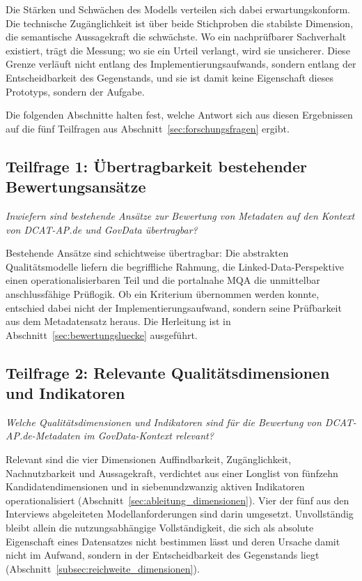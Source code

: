 Die Stärken und Schwächen des Modells verteilen sich dabei erwartungskonform. Die
technische Zugänglichkeit ist über beide Stichproben die stabilste Dimension, die
semantische Aussagekraft die schwächste. Wo ein nachprüfbarer Sachverhalt
existiert, trägt die Messung; wo sie ein Urteil verlangt, wird sie unsicherer.
Diese Grenze verläuft nicht entlang des Implementierungsaufwands, sondern entlang
der Entscheidbarkeit des Gegenstands, und sie ist damit keine Eigenschaft dieses
Prototyps, sondern der Aufgabe.

Die folgenden Abschnitte halten fest, welche Antwort sich aus diesen Ergebnissen
auf die fünf Teilfragen aus Abschnitt~\ref{sec:forschungsfragen} ergibt.

\subsection{Teilfrage 1: Übertragbarkeit bestehender Bewertungsansätze}
\label{sec:disk_grundlagen}

\emph{Inwiefern sind bestehende Ansätze zur Bewertung von Metadaten auf den
Kontext von DCAT-AP.de und GovData übertragbar?}

Bestehende Ansätze sind schichtweise übertragbar: Die abstrakten Qualitätsmodelle
liefern die begriffliche Rahmung, die Linked-Data-Perspektive einen
operationalisierbaren Teil und die portalnahe MQA die unmittelbar anschlussfähige
Prüflogik. Ob ein Kriterium übernommen werden konnte, entschied dabei nicht der
Implementierungsaufwand, sondern seine Prüfbarkeit aus dem Metadatensatz heraus.
Die Herleitung ist in Abschnitt~\ref{sec:bewertungsluecke} ausgeführt.

\subsection{Teilfrage 2: Relevante Qualitätsdimensionen und Indikatoren}
\label{sec:disk_dimensionen}

\emph{Welche Qualitätsdimensionen und Indikatoren sind für die Bewertung von
DCAT-AP.de-Metadaten im GovData-Kontext relevant?}

Relevant sind die vier Dimensionen Auffindbarkeit, Zugänglichkeit,
Nachnutzbarkeit und Aussagekraft, verdichtet aus einer Longlist von fünfzehn
Kandidatendimensionen und in siebenundzwanzig aktiven Indikatoren
operationalisiert (Abschnitt~\ref{sec:ableitung_dimensionen}). Vier der fünf aus
den Interviews abgeleiteten Modellanforderungen sind darin umgesetzt. Unvollständig
bleibt allein die nutzungsabhängige Vollständigkeit, die sich als absolute
Eigenschaft eines Datensatzes nicht bestimmen lässt und deren Ursache damit nicht
im Aufwand, sondern in der Entscheidbarkeit des Gegenstands liegt
(Abschnitt~\ref{subsec:reichweite_dimensionen}).

